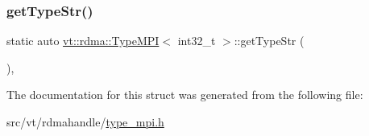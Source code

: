 \mbox{\label{structvt_1_1rdma_1_1_type_m_p_i_3_01int32__t_01_4_a67cdb3e2420567c925df06b90ed4760e}} 
\subsubsection{\texorpdfstring{get\+Type\+Str()}{getTypeStr()}}
{\footnotesize\ttfamily static auto \hyperlink{structvt_1_1rdma_1_1_type_m_p_i}{vt\+::rdma\+::\+Type\+M\+PI}$<$ int32\+\_\+t $>$\+::get\+Type\+Str (\begin{DoxyParamCaption}{ }\end{DoxyParamCaption})\hspace{0.3cm}{\ttfamily [inline]}, {\ttfamily [static]}}



The documentation for this struct was generated from the following file\+:\begin{DoxyCompactItemize}
\item 
src/vt/rdmahandle/\hyperlink{type__mpi_8h}{type\+\_\+mpi.\+h}\end{DoxyCompactItemize}
